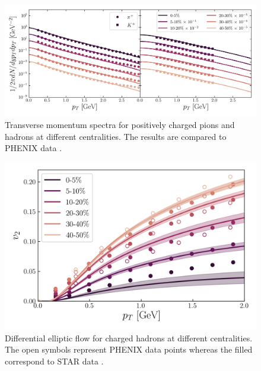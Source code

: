 \begin{figure}[!h]
	\includegraphics{images/plot_ptspectra_bulk.png}
	\caption{\normalsize Transverse momentum spectra for positively charged pions and hadrons at different centralities. The results are compared to {\sffamily PHENIX} data \cite{Adler:2003cb}.}
\end{figure}

\begin{figure}[H]
	\includegraphics[width=\textwidth]{images/vn_pt_bulk.png}
	\caption{\normalsize Differential elliptic flow for charged hadrons at different centralities. The open symbols represent {\sffamily PHENIX} data points \cite{Adare:2011tg} whereas the filled correspond to {\sffamily STAR} data \cite{Adams:2004bi}.} 
\end{figure}

